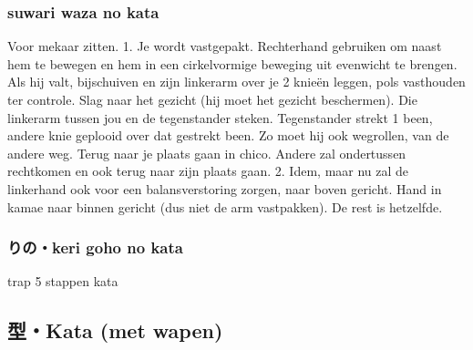 \subsubsection{suwari waza no kata}
Voor mekaar zitten.
1.
Je wordt vastgepakt. Rechterhand gebruiken om naast hem te bewegen en hem in een cirkelvormige beweging uit evenwicht te brengen. Als hij valt, bijschuiven en zijn linkerarm over je 2 knie\"{e}n leggen, pols vasthouden ter controle. Slag naar het gezicht (hij moet het gezicht beschermen). Die linkerarm tussen jou en de tegenstander steken. Tegenstander strekt 1 been, andere knie geplooid over dat gestrekt been. Zo moet hij ook wegrollen, van de andere weg. Terug naar je plaats gaan in chico. Andere zal ondertussen rechtkomen en ook terug naar zijn plaats gaan.
2.
Idem, maar nu zal de linkerhand ook voor een balansverstoring zorgen, naar boven gericht. Hand in kamae naar binnen gericht (dus niet de arm vastpakken). De rest is hetzelfde.

\subsubsection{りの・keri goho no kata}
trap 5 stappen kata

\subsection{型・Kata (met wapen)}
